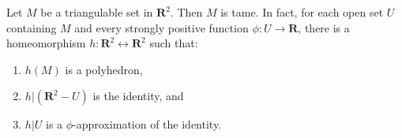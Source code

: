 Let $M$ be a triangulable set in $\mathbf{R}^2$. Then $M$ is tame. In fact, for each open set $U$ containing $M$ and every strongly positive function $\phi: U \to \mathbf{R}$, there is a homeomorphism $h: \mathbf{R}^2 \leftrightarrow \mathbf{R}^2$ such that:
\begin{enumerate}
\item $h(M)$ is a polyhedron,
\item $h | (\mathbf{R}^2 - U)$ is the identity, and
\item $h | U$ is a $\phi$-approximation of the identity.
\end{enumerate}
